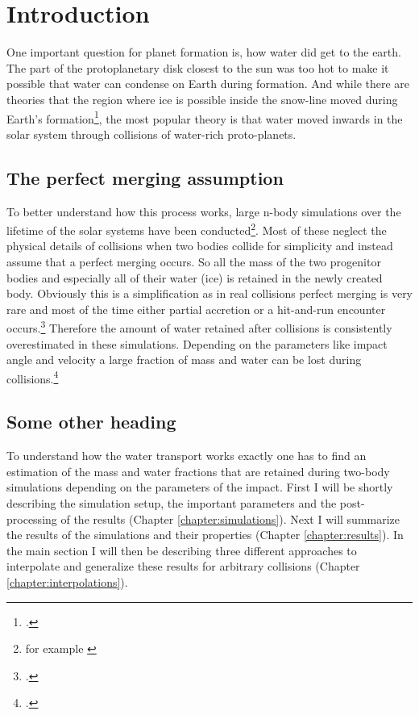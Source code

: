 \chapter{Introduction}\label{introduction}

One important question for planet formation is, how water did get to the earth. The part of the protoplanetary disk closest to the sun was too hot to make it possible that water can condense on Earth during formation. And while there are theories that the region where ice is possible inside the snow-line moved during Earth's formation\footcite{snowline}, the most popular theory is that water moved inwards in the solar system through collisions of water-rich proto-planets.%


\section{The perfect merging assumption}

To better understand how this process works, large n-body simulations over the lifetime of the solar systems have been conducted\footnote{for example \cite{dvorakSimulation}}. Most of these neglect the physical details of collisions when two bodies collide for simplicity and instead assume that a perfect merging occurs. So all the mass of the two progenitor bodies and especially all of their water (ice) is retained in the newly created body. Obviously this is a simplification as in real collisions perfect merging is very rare and most of the time either partial accretion or a hit-and-run encounter occurs.\footcite{CollisionTypes} Therefore the amount of water retained after collisions is consistently overestimated in these simulations. Depending on the parameters like impact angle and velocity a large fraction of mass and water can be lost during collisions.\footcite{MaindlSummary}

\section{Some other heading}

To understand how the water transport works exactly one has to find an estimation of the mass and water fractions that are retained during two-body simulations depending on the parameters of the impact.
First I will be shortly describing the simulation setup, the important parameters and the post-processing of the results (Chapter \ref{chapter:simulations}). Next I will summarize the results of the simulations and their properties (Chapter \ref{chapter:results}). In the main section I will then be describing three different approaches to interpolate and generalize these results for arbitrary collisions (Chapter \ref{chapter:interpolations}). 